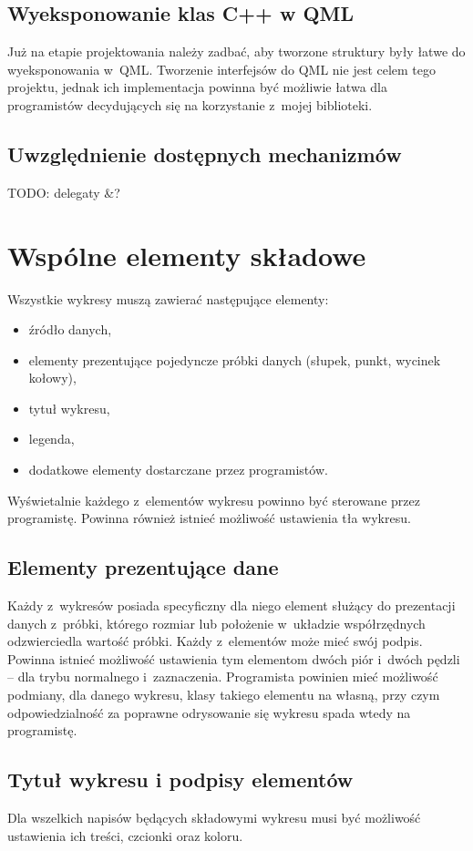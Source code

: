 \subsection{Wyeksponowanie klas C++ w QML}
Już na etapie projektowania należy zadbać, aby tworzone struktury były łatwe do wyeksponowania w~QML. 
Tworzenie interfejsów do QML nie jest celem tego projektu, jednak ich implementacja powinna być możliwie łatwa dla programistów decydujących się na korzystanie z~mojej biblioteki.

\subsection{Uwzględnienie dostępnych mechanizmów}
TODO:
delegaty \&?


\section{Wspólne elementy składowe}
Wszystkie wykresy muszą zawierać następujące elementy:
\begin{itemize}
\item{źródło danych,}
\item{elementy prezentujące pojedyncze próbki danych (słupek, punkt, wycinek kołowy),}
\item{tytuł wykresu,}
\item{legenda,}
\item{dodatkowe elementy dostarczane przez programistów.}
\end{itemize}

Wyświetalnie każdego z~elementów wykresu powinno być sterowane przez programistę. Powinna również istnieć możliwość ustawienia tła wykresu.

 
\subsection{Elementy prezentujące dane}
Każdy z~wykresów posiada specyficzny dla niego element służący do prezentacji danych z~próbki, którego rozmiar lub położenie w~układzie współrzędnych odzwierciedla wartość próbki. Każdy z~elementów może mieć swój podpis. Powinna istnieć możliwość ustawienia tym elementom dwóch piór i~dwóch pędzli -- dla trybu normalnego i~zaznaczenia. Programista powinien mieć możliwość podmiany, dla danego wykresu, klasy takiego elementu na własną, przy czym odpowiedzialność za poprawne odrysowanie się wykresu spada wtedy na programistę.

\subsection{Tytuł wykresu i podpisy elementów}
Dla wszelkich napisów będących składowymi wykresu musi być możliwość ustawienia ich treści, czcionki oraz koloru.

